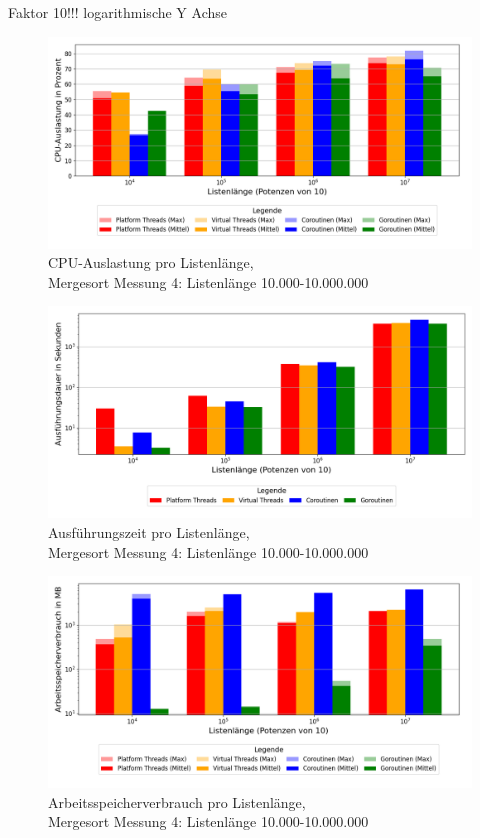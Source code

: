 \documentclass[fontsize=12pt,paper=a4,twoside=semi,parskip=half-,headsepline,headinclude]{scrreprt}
\begin{document}
Faktor 10!!!
logarithmische Y Achse

\begin{figure}[H]
	\centering
	\includegraphics[scale=0.5]{figures/mergesort/Listenlaenge/cpu_usage_bar_plot.png}
	\caption{CPU-Auslastung pro Listenlänge,\\ Mergesort Messung 4: Listenlänge 10.000-10.000.000}
	\label{fig:mslaengeCPU}
\end{figure}

\begin{figure}[H]
	\centering
	\includegraphics[scale=0.5]{figures/mergesort/Listenlaenge/execution_time_plot.png}
	\caption{Ausführungszeit pro Listenlänge,\\ Mergesort Messung 4: Listenlänge 10.000-10.000.000}
	\label{fig:mslaengeZeit}
\end{figure}

\begin{figure}[H]
	\centering
	\includegraphics[scale=0.5]{figures/mergesort/Listenlaenge/memory_usage_bar_plot.png}
	\caption{Arbeitsspeicherverbrauch pro Listenlänge,\\ Mergesort Messung 4: Listenlänge 10.000-10.000.000}
	\label{fig:mslaengeRAM}
\end{figure}
\end{document}
